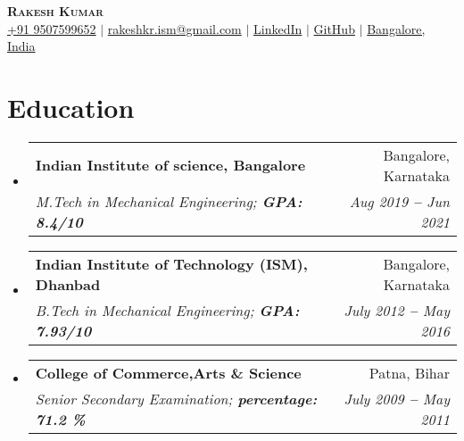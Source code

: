 \documentclass[letterpaper,11pt]{article}
\makeatletter
\newcommand{\resumeSubheading}[4]{
  \vspace{-2pt}\item
    \begin{tabular*}{0.97\textwidth}[t]{l@{\extracolsep{\fill}}r}
      \textbf{#1} & #2 \\
      \textit{\small#3} & \textit{\small #4} \\
    \end{tabular*}\vspace{-7pt}
}
\newcommand{\resumeSubHeadingListStart}{\begin{itemize}[leftmargin=0.15in, label={}]}
\newcommand{\resumeSubHeadingListEnd}{\end{itemize}}
\makeatother
\begin{document}

\begin{center}
    \textbf{\Huge \scshape Rakesh Kumar} \\ \vspace{3pt}
    \small
    \faMobile \hspace{.5pt} \href{tel:905314204536}{+91 9507599652}
    $|$
    \faAt \hspace{.5pt} \href{mailto:arasgungore09@gmail.com}{rakeshkr.ism@gmail.com}
    $|$
    \faLinkedinSquare \hspace{.5pt} \href{https://www.linkedin.com/in/rakeshkrism/}{LinkedIn}
    $|$
    \faGithub \hspace{.5pt} \href{https://github.com/rakeshkumar18}{GitHub}
    $|$
    \faMapMarker \hspace{.5pt} \href{https://www.google.com/maps/d/u/0/viewer?mid=1k35Ia3iDr0SyJaMdv2N6c2_AUvw&hl=en&ll=13.051909273508308%2C77.94435300000002&z=12}{Bangalore, India}
\end{center}




\section{Education}
  \vspace{3pt}
  \resumeSubHeadingListStart
    
    \resumeSubheading
      {Indian Institute of science, Bangalore}
	   {Bangalore, Karnataka}
	   {M.Tech in Mechanical Engineering;   \textbf{GPA: 8.4/10}}{Aug 2019 \textbf{--} Jun 2021}

       \vspace{2pt}
    \resumeSubheading
      {Indian Institute of Technology (ISM), Dhanbad}
	   {Bangalore, Karnataka}
	   {B.Tech in Mechanical Engineering;   \textbf{GPA: 7.93/10}}{July 2012 \textbf{--} May 2016}

       \vspace{2pt}     
    \resumeSubheading
      {College of Commerce,Arts \& Science }
      {Patna, Bihar}
      {Senior Secondary Examination;   \textbf{percentage: 71.2 \%}}{July 2009 \textbf{--} May 2011}

  \resumeSubHeadingListEnd



  
\end{document}
